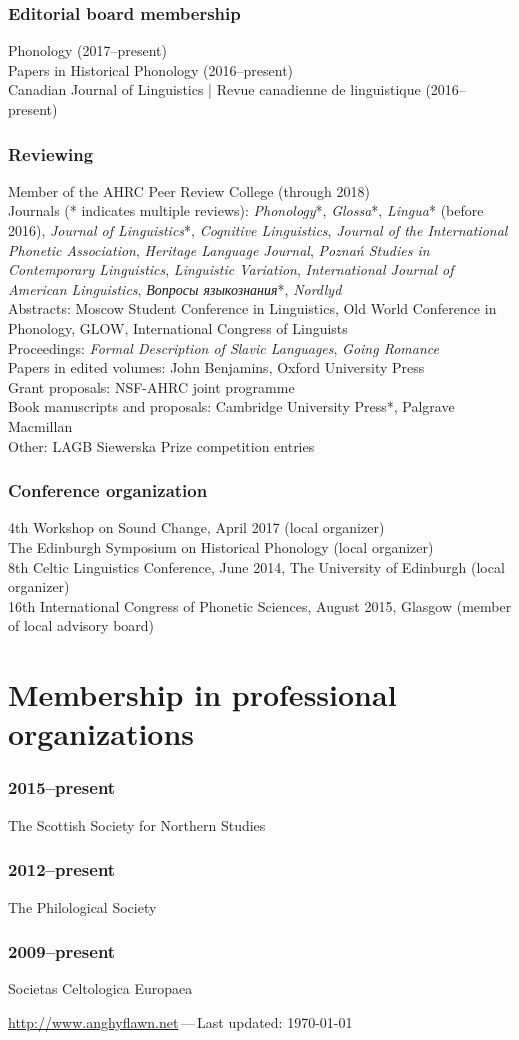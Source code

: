 \documentclass[a4paper,12pt]{article}
\newlength\blockwidth
\newcommand\textitrussian[1]{\textrussian{\textit{#1}}}
\newcommand\cvitem[1]{\hspace*{\blockwidth}\begin{minipage}[t]{\linewidth-\blockwidth}
#1
\end{minipage}\par}
\newcommand{\block}[2]{\subsubsection{#1}\cvitem{#2}}
\begin{document}
\block{Editorial board membership}{Phonology (2017--present)\\
  Papers in Historical Phonology (2016--present)\\
  Canadian Journal of Linguistics | Revue canadienne de linguistique (2016--present)}
\block{Reviewing}{Member of the AHRC Peer Review College (through 2018)\\Journals (* indicates multiple reviews): \emph{Phonology}*, \emph{Glossa}*, \emph{Lingua}* (before 2016), \emph{Journal of Linguistics}*, \emph{Cognitive Linguistics}, \emph{Journal of the International Phonetic Association}, \emph{Heritage Language Journal}, \emph{Poznań Studies in Contemporary Linguistics}, \emph{Linguistic Variation}, \emph{International Journal of American Linguistics}, \textitrussian{Вопросы языкознания}*, \emph{Nordlyd}\\
Abstracts: Moscow Student Conference in Linguistics, Old World Conference in Phonology, GLOW, International Congress of Linguists\\
Proceedings: \emph{Formal Description of Slavic Languages}, \emph{Going Romance}\\
Papers in edited volumes: John Benjamins, Oxford University Press\\
Grant proposals: NSF-AHRC joint programme\\
Book manuscripts and proposals: Cambridge University Press*, Palgrave Macmillan\\
Other: LAGB Siewerska Prize competition entries}
\block{Conference organization}{4th Workshop on Sound Change, April 2017 (local organizer)\\
  The Edinburgh Symposium on Historical Phonology (local organizer)\\
8th Celtic Linguistics Conference, June 2014, The University of Edinburgh (local organizer)\\
16th International Congress of Phonetic Sciences, August 2015, Glasgow (member of local advisory board)}

\section{Membership in professional organizations}
\block{2015--present}{The Scottish Society for Northern Studies}
\block{2012--present}{The Philological Society}
\block{2009--present}{Societas Celtologica Europaea}

\vfill{}
\hrulefill

\begin{center}
{\footnotesize \href{http://www.anghyflawn.net}{http://www.anghyflawn.net}{\,---\,}Last  updated: \today
}
\end{center}
\end{document}

